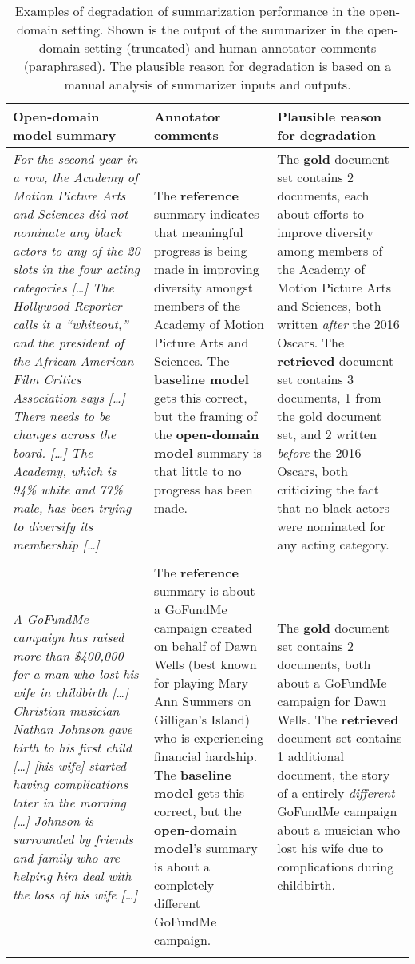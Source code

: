 \documentclass[11pt]{article}
\begin{document}
\begin{table*}[t]
	\small
	\centering
	\caption{Examples of degradation of summarization performance in the open-domain setting. Shown is the output of the summarizer in the open-domain setting (truncated) and human annotator comments (paraphrased). The plausible reason for degradation is based on a manual analysis of summarizer inputs and outputs.}
	\label{tab:manual-analysis}
	\small
	\begin{tabular}{p{} p{} p{}}
		\toprule
		Open-domain model summary                    & Annotator comments                                   & Plausible reason for degradation                                                                                                                             \\ \midrule
		\textit{For the second year in a row, the Academy of Motion Picture Arts and Sciences did not nominate any black actors to any of the 20 slots in the four acting categories […] The Hollywood Reporter calls it a ``whiteout,'' and the president of the African American Film Critics Association says […] There needs to be changes across the board. […] The Academy, which is 94\% white and 77\% male, has been trying to diversify its membership […]}      & The \textbf{reference} summary indicates that meaningful progress is being made in improving diversity amongst members of the Academy of Motion Picture Arts and Sciences. The \textbf{baseline model} gets this correct, but the framing of the \textbf{open-domain model} summary is that little to no progress has been made.                                    &  The \textbf{gold} document set contains 2 documents, each about efforts to improve diversity among members of the Academy of Motion Picture Arts and Sciences, both written \textit{after} the 2016 Oscars. The \textbf{retrieved} document set contains 3 documents, 1 from the gold document set, and 2 written \textit{before} the 2016 Oscars, both criticizing the fact that no black actors were nominated for any acting category.            \\ && \\
		\textit{A GoFundMe campaign has raised more than \$400,000 for a man who lost his wife in childbirth […] Christian musician Nathan Johnson gave birth to his first child […] [his wife] started having complications later in the morning […] Johnson is surrounded by friends and family who are helping him deal with the loss of his wife […]}      & The \textbf{reference} summary is about a GoFundMe campaign created on behalf of Dawn Wells (best known for playing Mary Ann Summers on Gilligan's Island) who is experiencing financial hardship. The \textbf{baseline model} gets this correct, but the \textbf{open-domain model}'s summary is about a completely different GoFundMe campaign.                                    &  The \textbf{gold} document set contains 2 documents, both about a GoFundMe campaign for Dawn Wells. The \textbf{retrieved} document set contains 1 additional document, the story of a entirely \textit{different} GoFundMe campaign about a musician who lost his wife due to complications during childbirth.                         \\ && \\

\end{tabular}
\end{table*}
\end{document}
